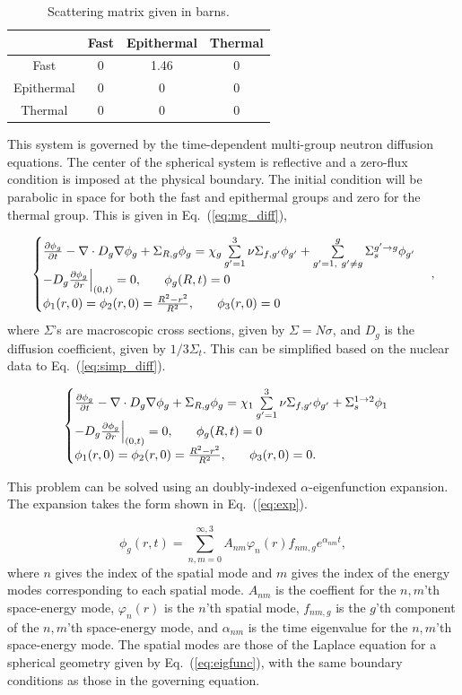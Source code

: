 \documentclass[12pt]{article}
\newcommand{\dxdy}[2]{\frac{\partial #1}{\partial #2}}
\newcommand{\be}{\begin{equation}}
\newcommand{\ee}{\end{equation}}
\newcommand{\pev}{\hspace{0.25in}}
\newcommand{\LEQ}[1]{\label{eq:#1}}
\newcommand{\EQ}[1]{Eq.~(\ref{eq:#1})}
\newcommand{\LTA}[1]{\label{ta:#1}}
\newcommand{\bt}{\begin{table}}
\newcommand{\et}{\end{table}}
\newcommand{\btb}{\begin{center}\begin{tabular}}
\newcommand{\etb}{\end{tabular}\end{center}}
\begin{document}
\bt[h] \centering 
	\caption{Scattering matrix given in barns.} 
	\btb{|c|c|c|c|}
		\hline
		\diagbox{From}{To}& Fast  & Epithermal  & Thermal  \\  \hline
		Fast  & 0 & 1.46 & 0 \\  \hline
		Epithermal & 0 & 0 & 0 \\  \hline
		Thermal  & 0 & 0 & 0 \\  \hline
	\etb \LTA{scat}
\et

This system is governed by the time-dependent multi-group neutron diffusion equations. 
The center of the spherical system is reflective and a zero-flux condition is imposed at the physical boundary. 
The initial condition will be parabolic in space for both the fast and epithermal groups and zero for the thermal group. 
This is given in \EQ{mg_diff},

\be
	\begin{cases}
	\dxdy{\phi_g}{t} - \nabla \cdot D_g \nabla \phi_g + \Sigma_{R,g} \phi_g = \chi_g \sum\limits_{g'=1}^{3} \nu\Sigma_{f,g'} \phi_{g'} + 
	\sum\limits_{g'=1, \ g' \neq g}^g \Sigma_s^{g' \rightarrow g} \phi_{g'} \\
	-D_g \dxdy{\phi_g}{r} \Big\rvert_{(0,t)} = 0, \pev \phi_g(R,t) = 0 \\
	\phi_1(r,0) = \phi_2(r,0) = \frac{R^2 - r^2}{R^2}, \pev \phi_3(r,0) = 0
	\end{cases} ,
\LEQ{mg_diff} \ee 
where $\Sigma$'s are macroscopic cross sections, given by $\Sigma = N\sigma$, 
and $D_g$ is the diffusion coefficient, given by $1/3\Sigma_t$. 
This can be simplified based on the nuclear data to \EQ{simp_diff}.

\be
	\begin{cases}
	\dxdy{\phi_g}{t} - \nabla \cdot D_g \nabla \phi_g + \Sigma_{R,g} \phi_g = \chi_1 \sum\limits_{g'=1}^{3} \nu\Sigma_{f,g'} \phi_{g'} 
	+ \Sigma_s^{1 \rightarrow 2} \phi_{1} \\
	-D_g \dxdy{\phi_g}{r} \Big\rvert_{(0,t)} = 0, \pev \phi_g(R,t) = 0 \\
	\phi_1(r,0) = \phi_2(r,0) = \frac{R^2 - r^2}{R^2}, \pev \phi_3(r,0) = 0.
	\end{cases} 
\LEQ{simp_diff}\ee

This problem can be solved using an doubly-indexed $\alpha$-eigenfunction expansion.  
The expansion takes the form shown in \EQ{exp}.

\be
	\phi_g(r, t) = \sum_{n, m = 0}^{\infty, 3} A_{nm} \varphi_n(r) f_{nm, g} e^{\alpha_{nm} t},
\LEQ{exp} \ee
where $n$ gives the index of the spatial mode and $m$ gives the index of the energy modes corresponding to each spatial mode.
$A_{nm}$ is the coeffient for the $n,m$'th space-energy mode, $\varphi_n(r)$ is the $n$'th spatial mode, 
$f_{nm, g}$ is the $g$'th component of the $n,m$'th space-energy mode, 
and $\alpha_{nm}$ is the time eigenvalue for the $n,m$'th space-energy mode. 
The spatial modes are those of the Laplace equation for a spherical geometry given by \EQ{eigfunc},
with the same boundary conditions as those in the governing equation.
\end{document}
